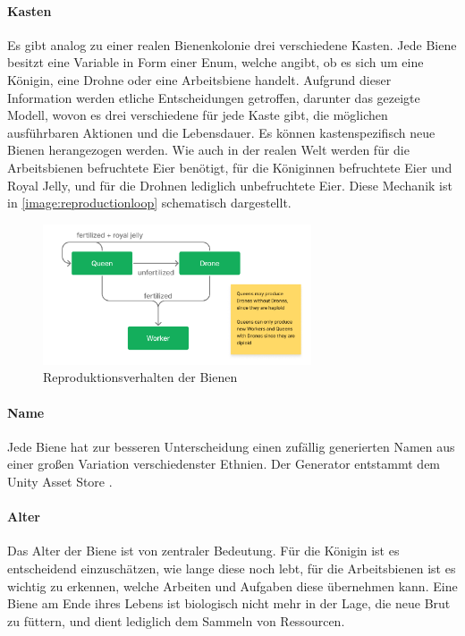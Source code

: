 \paragraph{Kasten}
Es gibt analog zu einer realen Bienenkolonie drei verschiedene Kasten. Jede Biene besitzt eine Variable in Form einer Enum, welche angibt, ob es sich um eine Königin, eine Drohne oder eine Arbeitsbiene handelt. Aufgrund dieser Information werden etliche Entscheidungen getroffen, darunter das gezeigte Modell, wovon es drei verschiedene für jede Kaste gibt, die möglichen ausführbaren Aktionen und die Lebensdauer. Es können kastenspezifisch neue Bienen herangezogen werden. Wie auch in der realen Welt werden für die Arbeitsbienen befruchtete Eier benötigt, für die Königinnen befruchtete Eier und Royal Jelly, und für die Drohnen lediglich unbefruchtete Eier. Diese Mechanik ist in \autoref{image:reproductionloop} schematisch dargestellt.

\begin{figure}
    \begin{center}
        \includegraphics[width=300px]{0.bilder/reproductionloop.png}
    \end{center}
    \caption{Reproduktionsverhalten der Bienen} \label{image:reproductionloop}
\end{figure}

\paragraph{Name}
Jede Biene hat zur besseren Unterscheidung einen zufällig generierten Namen aus einer großen Variation verschiedenster Ethnien. Der Generator entstammt dem Unity Asset Store \cite*[]{asset:namegenerator}.

\paragraph{Alter} 
Das Alter der Biene ist von zentraler Bedeutung. Für die Königin ist es entscheidend einzuschätzen, wie lange diese noch lebt, für die Arbeitsbienen ist es wichtig zu erkennen, welche Arbeiten und Aufgaben diese übernehmen kann. Eine Biene am Ende ihres Lebens ist biologisch nicht mehr in der Lage, die neue Brut zu füttern, und dient lediglich dem Sammeln von Ressourcen.

